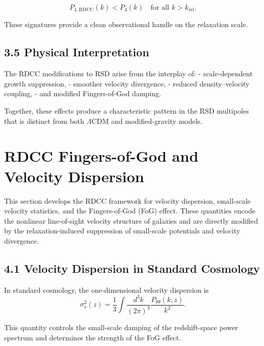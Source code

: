 \documentclass[11pt,a4paper]{article}
\begin{document}
\[
P_{4,\mathrm{RDCC}}(k)
<
P_{4}(k)
\quad \text{for all } k > k_{\mathrm{rel}}.
\]



These signatures provide a clean observational handle on the relaxation scale.

\subsection{3.5 Physical Interpretation}

The RDCC modifications to RSD arise from the interplay of:
- scale-dependent growth suppression,
- smoother velocity divergence,
- reduced density–velocity coupling,
- and modified Fingers-of-God damping.

Together, these effects produce a characteristic pattern in the RSD multipoles that is distinct
from both $\Lambda$CDM and modified-gravity models.


\section{RDCC Fingers-of-God and Velocity Dispersion}

This section develops the RDCC framework for velocity dispersion, small-scale velocity
statistics, and the Fingers-of-God (FoG) effect. These quantities encode the nonlinear
line-of-sight velocity structure of galaxies and are directly modified by the relaxation-induced
suppression of small-scale potentials and velocity divergence.

\subsection{4.1 Velocity Dispersion in Standard Cosmology}

In standard cosmology, the one-dimensional velocity dispersion is
\begin{equation}
\sigma_{v}^{2}(z)
=
\frac{1}{3}
\int
\frac{d^{3}k}{(2\pi)^{3}}
\frac{P_{\theta\theta}(k,z)}{k^{2}}.
\end{equation}

This quantity controls the small-scale damping of the redshift-space power spectrum and
determines the strength of the FoG effect.
\end{document}
